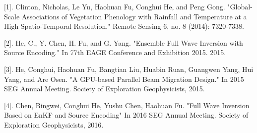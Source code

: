 

[1]. Clinton, Nicholas, Le Yu, Haohuan Fu, Conghui He, and Peng Gong. "Global-Scale Associations of Vegetation Phenology with Rainfall and Temperature at a High Spatio-Temporal Resolution." Remote Sensing 6, no. 8 (2014): 7320-7338.

[2]. He, C., Y. Chen, H. Fu, and G. Yang. "Ensemble Full Wave Inversion with Source Encoding." In 77th EAGE Conference and Exhibition 2015. 2015.

[3]. He, Conghui, Haohuan Fu, Bangtian Liu, Huabin Ruan, Guangwen Yang, Hui Yang, and Are Osen. "A GPU-based Parallel Beam Migration Design." In 2015 SEG Annual Meeting. Society of Exploration Geophysicists, 2015.

[4]. Chen, Bingwei, Conghui He, Yushu Chen, Haohuan Fu. "Full Wave Inversion Based on EnKF and Source Encoding" In 2016 SEG Annual Meeting. Society of Exploration Geophysicists, 2016.
